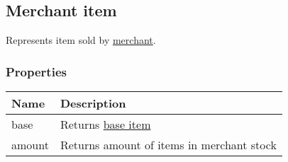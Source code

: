 \subsection{Merchant item}
\label{MerchantItem}
Represents item sold by \hyperref[Merchant]{merchant}.
\subsubsection{Properties}
\begin{center}
\begin{tabularx}{\linewidth}{| l | X |}
\hline
\textbf{Name} & \textbf{Description} \\
\hline
base & Returns \hyperref[ItemBase]{base item}\\
\hline
amount & Returns amount of items in merchant stock\\
\hline
\end{tabularx}
\end{center}